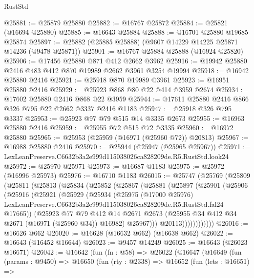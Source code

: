 \begin{lexlean}{RustStd}
\begin{coremodule}
@25881 := @25879 @25880
@25882 := @16767 @25872
@25884 := @25821 (@16694 @25880)
@25885 := @16643 @25884
@25888 := @16701 @25880 @19685 @25874
@25897 := @25882 (@25885 @25888) (@9607 @14229 @14225 @25871 @14236 (@9478 @25871))
@25901 := @16767 @25884 @25888 (@16924 @25820)
@25906 := @17456 @25880 @871 @412 @2662 @3962
@25916 := @19942 @25880 @2416 @483 @412 @870 @19989 @2662 @3961 @3254 @19994
@25918 := @16942 @25880 @2416
@25921 := @25918 @870 @19989 @3961
@25923 := @16951 @25880 @2416
@25929 := @25923 @868 @80 @22 @414 @3959 @2674
@25934 := @17602 @25880 @2416 @868 @22 @3959
@25944 := @17611 @25880 @2416 @866 @326 @795 @22 @2662 @3337 @2416 @1183
@25947 := @25918 @326 @795 @3337
@25953 := @25923 @97 @79 @515 @14 @3335 @2673
@25955 := @16963 @25880 @2416
@25959 := @25955 @72 @515 @72 @3335
@25960 := @16972 @25880
@25965 := @25953 (@25959 (@16971 (@25960 @72)) @20813)
@25967 := @16988 @25880 @2416
@25970 := @25944 (@25947 (@25965 @25967))
@25971 := LexLeanPreserve.C6632b3a2e999d115038026ca828209de.R5.RustStd.look24
@25972 := @25970 @25971
@25973 := @16687 @1183
@25975 := @25972 (@16996 @25973)
@25976 := @16710 @1183
@26015 := @25747
    (@25769
      (@25809
        (@25811
          (@25813
            (@25834
              (@25852
                (@25867
                  (@25881
                    (@25897
                      (@25901
                        (@25906
                          (@25916
                            (@25921
                              (@25929
                                (@25934
                                  (@25975
                                    (@17000 @25976)
                                    LexLeanPreserve.C6632b3a2e999d115038026ca828209de.R5.RustStd.fal24
                                    @17665))
                                (@25923
                                  @77
                                  @79
                                  @412
                                  @14
                                  @2671
                                  @2673
                                  (@25955 @34 @412 @34 @2671 (@16971 (@25960 @34)) @16982)
                                  @25967)))
                            @20113))))))))))))
@26016 := @16626 @662
@26020 := @16628 (@16632 @662) (@16638 @662)
@26022 := @16643 (@16452 @16644)
@26023 := @9457 @14249
@26025 := @16643 (@26023 @16671)
@26042 := @16642
    (fun (fn : @58) =>
    @26022
      (@16647
        (@16649
          (fun (params : @9450) =>
          @16650
            (fun (rty : @2338) =>
            @16652
              (fun (lets : @16651) =>

\end{coremodule}
\end{lexlean}
